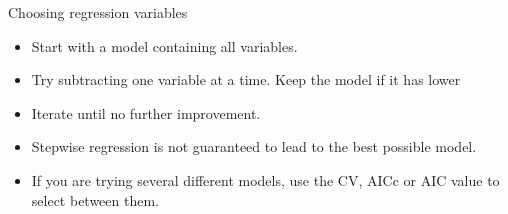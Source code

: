 \documentclass[14pt]{beamer}
\makeatletter
\def\biz{\begin{itemize}[<+-| alert@+>]}
\def\eiz{\end{itemize}}
\makeatother
\begin{document}








\begin{frame}[squeeze,shrink=0.99]{Choosing regression variables}

\biz
\item Start with a model containing all variables.

\item Try subtracting one variable at a time. Keep the model if it
has lower 

\item Iterate until no further improvement.
\eiz

\pause%

\structure{\textcolor[rgb]{0.80,0.00,0.00}{Notes:}}
\biz\itemsep=0cm\parskip=0cm
%

\item Stepwise regression is not guaranteed to lead to the best possible
model.

\item If you are trying several different models, use the CV, AICc or AIC %
value to select between them.
\eiz

\end{frame}
\end{document}
